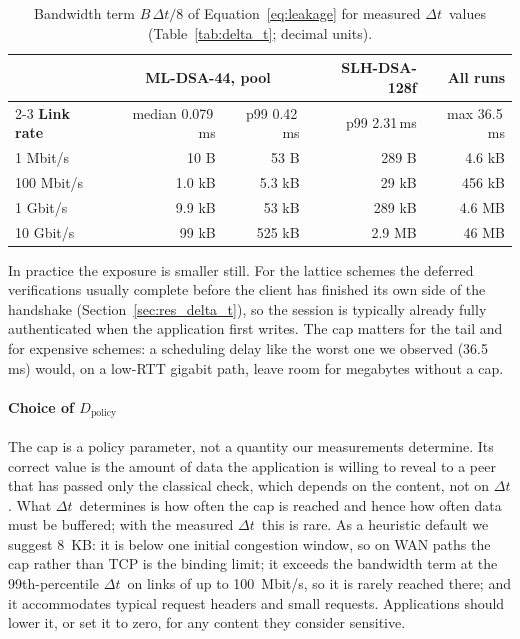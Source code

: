 \documentclass[preprint,10pt,3p]{elsarticle}
\newcommand{\Dt}{\ensuremath{\Delta t}}
\newcommand{\ms}{\,ms}
\begin{document}
\begin{table}[t]
\centering
\caption{Bandwidth term $B\,\Dt/8$ of Equation~\eqref{eq:leakage} for
  measured \Dt\ values (Table~\ref{tab:delta_t}; decimal units).}
\label{tab:leakage}
\small
\begin{tabular}{lrrrr}
\toprule
& \multicolumn{2}{c}{\textbf{ML-DSA-44, pool}} & \textbf{SLH-DSA-128f} & \textbf{All runs} \\
\cmidrule(lr){2-3}
\textbf{Link rate} & median 0.079\ms & p99 0.42\ms & p99 2.31\ms & max 36.5\ms \\
\midrule
1 Mbit/s   & 10 B    & 53 B    & 289 B   & 4.6 kB  \\
100 Mbit/s & 1.0 kB  & 5.3 kB  & 29 kB   & 456 kB  \\
1 Gbit/s   & 9.9 kB  & 53 kB   & 289 kB  & 4.6 MB  \\
10 Gbit/s  & 99 kB   & 525 kB  & 2.9 MB  & 46 MB   \\
\bottomrule
\end{tabular}
\end{table}

In practice the exposure is smaller still.  For the lattice schemes the
deferred verifications usually complete before the client has finished its
own side of the handshake (Section~\ref{sec:res_delta_t}), so the session
is typically already fully authenticated when the application first writes.
The cap matters for the tail and for expensive schemes: a scheduling delay
like the worst one we observed (36.5\ms) would, on a low-RTT gigabit path,
leave room for megabytes without a cap.

\paragraph{Choice of $D_\text{policy}$}  The cap is a policy parameter,
not a quantity our measurements determine.  Its correct value is the
amount of data the application is willing to reveal to a peer that has
passed only the classical check, which depends on the content, not on
\Dt.  What \Dt\ determines is how often the cap is reached and hence how
often data must be buffered; with the measured \Dt\ this is rare.  As a
heuristic default we suggest 8~KB: it is below one initial congestion
window, so on WAN paths the cap rather than TCP is the binding limit; it
exceeds the bandwidth term at the 99th-percentile \Dt\ on links of up to
100~Mbit/s, so it is rarely reached there; and it accommodates typical
request headers and small requests.  Applications should lower it, or set
it to zero, for any content they consider sensitive.
\end{document}
